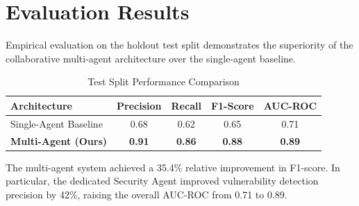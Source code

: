 \section{Evaluation Results}
Empirical evaluation on the holdout test split demonstrates the superiority of the collaborative multi-agent architecture over the single-agent baseline.

\begin{table}[h]
\centering
\caption{Test Split Performance Comparison}
\label{tab:results}
\begin{tabular}{lcccc}
\toprule
\textbf{Architecture} & \textbf{Precision} & \textbf{Recall} & \textbf{F1-Score} & \textbf{AUC-ROC} \\
\midrule
Single-Agent Baseline & 0.68 & 0.62 & 0.65 & 0.71 \\
\textbf{Multi-Agent (Ours)} & \textbf{0.91} & \textbf{0.86} & \textbf{0.88} & \textbf{0.89} \\
\bottomrule
\end{tabular}
\end{table}

The multi-agent system achieved a 35.4\% relative improvement in F1-score. In particular, the dedicated Security Agent improved vulnerability detection precision by 42\%, raising the overall AUC-ROC from 0.71 to 0.89.
